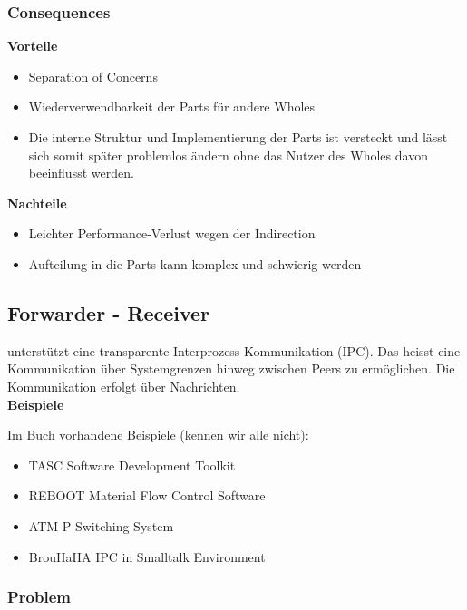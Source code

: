\subsubsection{Consequences}

\textbf{Vorteile}

\begin{itemize}
    \item Separation of Concerns
    \item Wiederverwendbarkeit der Parts für andere Wholes
    \item Die interne Struktur und Implementierung der Parts ist versteckt und lässt sich somit später problemlos ändern ohne das Nutzer des Wholes davon beeinflusst werden.
\end{itemize}
\vspace{10pt}
\textbf{Nachteile}

\begin{itemize}
    \item Leichter Performance-Verlust wegen der Indirection
    \item Aufteilung in die Parts kann komplex und schwierig werden
\end{itemize}

\subsection{Forwarder - Receiver}

unterstützt eine transparente Interprozess-Kommunikation (IPC). Das heisst eine Kommunikation über Systemgrenzen hinweg zwischen Peers zu ermöglichen. Die Kommunikation erfolgt über Nachrichten. \\

\textbf{Beispiele}

Im Buch vorhandene Beispiele (kennen wir alle nicht):

\begin{itemize}
    \item TASC Software Development Toolkit
    \item REBOOT Material Flow Control Software
    \item ATM-P Switching System
    \item BrouHaHA IPC in Smalltalk Environment
\end{itemize}

\subsubsection{Problem}

